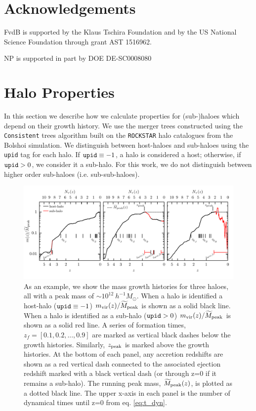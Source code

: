 \documentclass[a4paper,fleqn,usenatbib]{mnras}
\begin{document}
\section*{Acknowledgements}

FvdB is supported by the Klaus Tschira Foundation and by the US National Science Foundation through grant AST 1516962.

NP is supported in part by DOE DE-SC0008080

%

 

\appendix

\section{Halo Properties}
\label{sec:halo_properties}

In this section we describe how we calculate properties for (sub-)haloes which depend on their growth history.  We use the merger trees constructed using the {\tt Consistent} trees algorithm \citep{Behroozi:2013dz} built on the {\tt ROCKSTAR} halo catalogues from the Bolshoi simulation.  We distinguish between host-haloes and sub-haloes using the {\tt upid} tag for each halo.  If $ {\tt upid} \equiv -1$, a halo is considered a host; otherwise, if ${\tt upid} > 0$, we consider it a sub-halo.  For this work, we do not distinguish between higher order sub-haloes (i.e. sub-sub-haloes).

\begin{figure}
    \includegraphics{figures/growth_hist.pdf}
    \caption{As an example, we show the mass growth histories for three haloes, all with a peak mass of $\sim 10^{12}~h^{-1}M_{\odot}$.  When a halo is identified a host-halo (${\tt upid} \equiv -1$) $m_{\rm vir}(z)/\widetilde{M}_{\rm peak}$ is shown as a solid black line.  When a halo is identified as a sub-halo (${\tt upid} > 0$) $m_{\rm vir}(z)/\widetilde{M}_{\rm peak}$ is shown as a solid red line.  A series of formation times, $z_{f} = [0.1,0.2,...,0.9]$ are marked as vertical black dashes below the growth histories.  Similarly, $z_{\rm peak}$ is marked above the growth histories.  At the bottom of each panel, any accretion redshifts are shown as a red vertical dash connected to the associated ejection redshift marked with a black vertical dash (or through z=0 if it remains a sub-halo).  The running peak mass, $\widetilde{M}_{\rm peak}(z)$, is plotted as a dotted black line.  The upper x-axis in each panel is the number of dynamical times until z=0 from eq. \ref{eq:t_dyn}.}
    \label{fig:growth_hist}
\end{figure}
\end{document}
